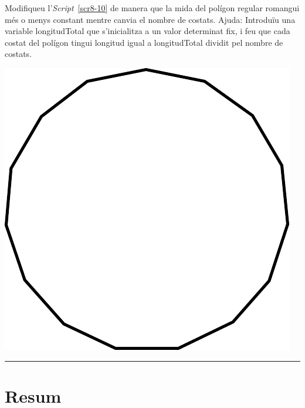 \begin{center}
\colorbox{black}{}
\end{center}
{\small
\noindent
Modifiqueu l'\emph{Script}~\ref{scr8-10} de manera que la mida del polígon regular romangui més o menys constant mentre canvia el nombre de costats. Ajuda: Introduïu una variable \textsf{longitudTotal} que s'inicialitza a un valor determinat fix, i feu que cada costat del polígon tingui longitud igual a \textsf{longitudTotal} dividit pel nombre de costats.}
\begin{center}
\includegraphics[scale=0.5]{Imatges/figuraE8-8.pdf}
\end{center}
\noindent
\rule{\textwidth}{3pt}

\section{Resum}


